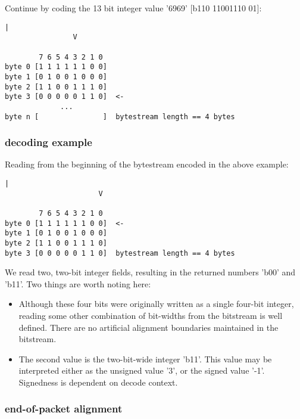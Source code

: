 Continue by coding the 13 bit integer value '6969' [b110 11001110 01]:

\begin{Verbatim}[commandchars=\\\{\}]
                |
                V

        7 6 5 4 3 2 1 0
byte 0 [1 1 1 1 1 1 0 0]
byte 1 [0 1 0 0 1 0 0 0]
byte 2 [1 1 0 0 1 1 1 0]
byte 3 [0 0 0 0 0 1 1 0]  <-
             ...
byte n [               ]  bytestream length == 4 bytes

\end{Verbatim}




\subsubsection{decoding example}

Reading from the beginning of the bytestream encoded in the above example:

\begin{Verbatim}[commandchars=\\\{\}]
                      |
                      V

        7 6 5 4 3 2 1 0
byte 0 [1 1 1 1 1 1 0 0]  <-
byte 1 [0 1 0 0 1 0 0 0]
byte 2 [1 1 0 0 1 1 1 0]
byte 3 [0 0 0 0 0 1 1 0]  bytestream length == 4 bytes

\end{Verbatim}


We read two, two-bit integer fields, resulting in the returned numbers
'b00' and 'b11'.  Two things are worth noting here:

\begin{itemize}
\item Although these four bits were originally written as a single
four-bit integer, reading some other combination of bit-widths from the
bitstream is well defined.  There are no artificial alignment
boundaries maintained in the bitstream.

\item The second value is the
two-bit-wide integer 'b11'.  This value may be interpreted either as
the unsigned value '3', or the signed value '-1'.  Signedness is
dependent on decode context.
\end{itemize}




\subsubsection{end-of-packet alignment}

